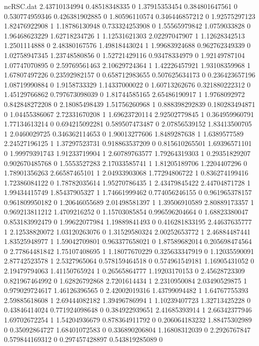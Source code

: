 \begin{filecontents}{ncRSC.dat}
2.43710134994 0.48518348335 0
1.37915353454 0.384801647561 0
0.530774959346 0.426381902885 0
1.80596110574 0.346446857212 0
1.92575297123 1.82476922908 1
1.18786130948 0.733324253908 0
1.55565979842 1.0759033828 0
1.96468623229 1.62718234726 1
1.12531621303 2.02297047907 1
1.12628342513 1.2501114888 0
2.48380167576 1.49818443024 1
1.99683924688 0.962762349339 0
1.02758947345 1.23748580856 0
1.52721429116 0.93478334979 0
1.92149787104 1.07747070895 0
2.59769561463 2.10629724364 1
1.42226457921 1.93108359968 1
1.67807497226 0.23592982157 0
0.658712983655 0.507625634173 0
0.236423657196 1.08719990884 0
1.9158733329 1.14337000022 0
1.60713262676 0.321880222312 0
1.45129766862 0.797673098039 0
1.81744585165 2.65486190917 1
1.9768092972 0.842848272208 0
2.18085498439 1.51756260968 1
0.888398292839 0.180283494871 0
1.04455386067 2.72331670208 1
1.69623720114 2.92502779845 1
0.364959960791 1.77134613214 0
0.694215092281 0.589507473487 0
2.07856539152 1.83413500705 1
2.0460029725 0.346362114653 0
1.90013277606 1.8489287638 1
1.6389577589 2.24527196125 1
1.37297523731 0.918863537209 0
0.815610265501 1.69396571101 0
1.99979391743 1.91233719904 1
2.60789763577 1.79264319303 1
0.29351829207 0.902670485768 0
1.5553527283 2.17033585741 1
1.81205189706 1.2204407296 0
1.78901356263 2.66587465101 1
2.04933903068 1.77294806722 1
0.836274199416 1.72386084122 0
1.78782035614 1.95270786435 1
2.43479845422 2.44704871728 1
1.99434415749 1.85437905327 1
1.74661999462 0.774056246155 0
0.961965378157 0.961809950182 0
1.20646055689 2.01498581397 1
1.39506910589 2.80889173357 1
0.969213811212 1.4709216252 0
1.15703085854 0.996596204664 0
1.68823380047 0.853183992479 0
1.99622077984 1.19889841493 0
0.416281833195 2.44637635777 1
2.12538820072 1.03120263076 0
1.31529580324 2.00252653772 1
2.46884487441 1.83525948977 1
1.59042709801 0.963377658021 0
1.87589682014 0.205698474564 0
2.77864481842 1.75107408695 1
1.18077670229 0.325633347919 0
1.12035590091 2.87742523578 1
2.5327965064 0.578159464518 0
0.574961549181 1.16905431052 0
2.19479794063 1.41150765924 1
0.26565864777 1.19203170153 0
2.45628723309 0.821967464992 0
1.62826792868 2.7201614434 1
2.2310950084 2.03490529875 1
0.979029724617 1.46126396565 0
2.42002019316 1.43799094482 1
1.64767755393 2.59885618608 1
2.69444082182 1.39496786994 1
1.10239407723 1.32713425228 0
0.43846414024 0.771924098648 0
0.384922939651 2.41685393914 1
2.66342377946 1.69702672254 1
1.54204936679 0.878364911792 0
0.206064183232 1.88475302989 0
0.35092864727 1.68401072583 0
0.336890206804 1.16808312039 0
2.2926767847 0.579844169312 0
0.297457428897 0.543819285089 0

\end{filecontents}
